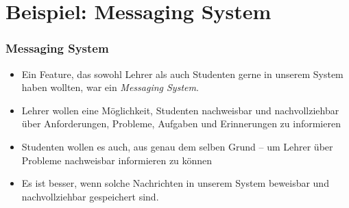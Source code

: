 \documentclass[aspectratio=169,mathserif,notheorems]{beamer}%
\begin{document}
\section{Beispiel: Messaging System}%
%
\begin{frame}%
\frametitle{Messaging System}%
\begin{itemize}%
\item Ein Feature, das sowohl Lehrer als auch Studenten gerne in unserem System haben wollten, war ein \emph{Messaging System}.%
%
\item<2-> Lehrer wollen eine Möglichkeit, Studenten nachweisbar und nachvollziehbar über Anforderungen, Probleme, Aufgaben und Erinnerungen zu informieren%
%
\item<4-> Studenten wollen es auch, aus genau dem selben Grund -- um Lehrer über Probleme nachweisbar informieren zu können%
%
\item<6-> Es ist besser, wenn solche Nachrichten in unserem System beweisbar und nachvollziehbar gespeichert sind.%
%
\end{itemize}%
\end{frame}%
%
\end{document}
